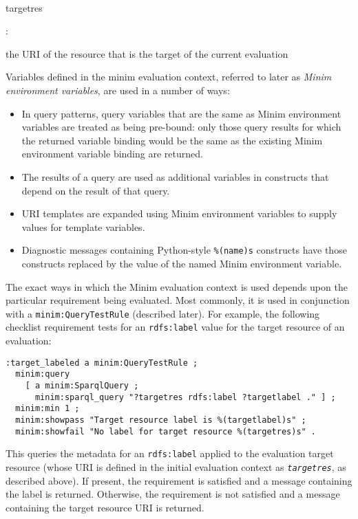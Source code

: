 \documentclass[]{article}
\begin{document}
~~

targetres

:

the URI of the resource that is the target of the current evaluation

Variables defined in the minim evaluation context, referred to later as
\emph{Minim environment variables}, are used in a number of ways:

\begin{itemize}
\itemsep1pt\parskip0pt
\item
  In query patterns, query variables that are the same as Minim
  environment variables are treated as being pre-bound: only those query
  results for which the returned variable binding would be the same as
  the existing Minim environment variable binding are returned.
\item
  The results of a query are used as additional variables in constructs
  that depend on the result of that query.
\item
  URI templates are expanded using Minim environment variables to supply
  values for template variables.
\item
  Diagnostic messages containing Python-style \texttt{\%(name)s}
  constructs have those constructs replaced by the value of the named
  Minim environment variable.
\end{itemize}

The exact ways in which the Minim evaluation context is used depends
upon the particular requirement being evaluated. Most commonly, it is
used in conjunction with a \texttt{minim:QueryTestRule} (described
later). For example, the following checklist requirement tests for an
\texttt{rdfs:label} value for the target resource of an evaluation:

\begin{verbatim}
:target_labeled a minim:QueryTestRule ;
  minim:query 
    [ a minim:SparqlQuery ; 
      minim:sparql_query "?targetres rdfs:label ?targetlabel ." ] ;
  minim:min 1 ;
  minim:showpass "Target resource label is %(targetlabel)s" ;
  minim:showfail "No label for target resource %(targetres)s" .
\end{verbatim}

This queries the metadata for an \texttt{rdfs:label} applied to the
evaluation target resource (whose URI is defined in the initial
evaluation context as \emph{\texttt{targetres}}, as described above). If
present, the requirement is satisfied and a message containing the label
is returned. Otherwise, the requirement is not satisfied and a message
containing the target resource URI is returned.
\end{document}
